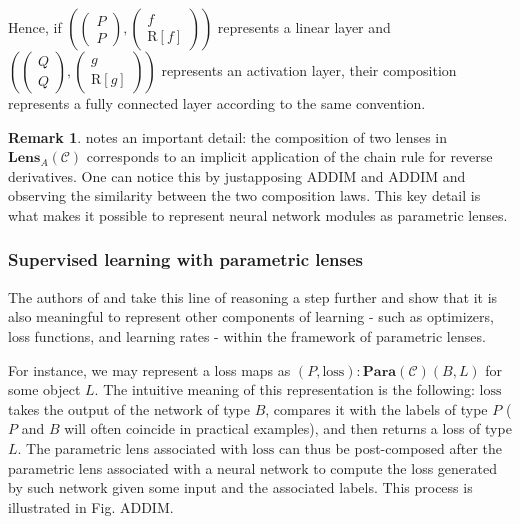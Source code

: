 \documentclass[12pt,a4paper,openright,twoside]{report}
\theoremstyle{plain}
\theoremstyle{definition}
\newtheorem{remark}[proposition]{Remark}
\begin{document}
Hence, if $\left(\left(\begin{smallmatrix} P \\ P \end{smallmatrix}\right),\left(\begin{smallmatrix} f \\ \mathrm{R}[f] \end{smallmatrix}\right)\right)$ represents a linear layer and $\left(\left(\begin{smallmatrix} Q \\ Q \end{smallmatrix}\right),\left(\begin{smallmatrix} g \\ \mathrm{R}[g] \end{smallmatrix}\right)\right)$ represents an activation layer, their composition represents a fully connected layer according to the same convention.


\begin{remark}
  \cite{shiebler2021category} notes an important detail: the composition of two lenses in $\mathbf{Lens}_A(\mathcal{C})$ corresponds to an implicit application of the chain rule for reverse derivatives. One can notice this by justapposing ADDIM and ADDIM and observing the similarity between the two composition laws. This key detail is what makes it possible to represent neural network modules as parametric lenses.
\end{remark}
 

\subsubsection{Supervised learning with parametric lenses}


The authors of \cite{cruttwell2022categorical} and \cite{gavranovic2024fundamental} take this line of reasoning a step further and show that it is also meaningful to represent other components of learning - such as optimizers, loss functions, and learning rates - within the framework of parametric lenses. 


For instance, we may represent a loss maps as $(P,\mathrm{loss}) : \mathbf{Para}(\mathcal{C})(B,L)$ for some object $L$. The intuitive meaning of this representation is the following: $\mathrm{loss}$ takes the output of the network of type $B$, compares it with the labels of type $P$ ($P$ and $B$ will often coincide in practical examples), and then returns a loss of type $L$. The parametric lens associated with $\mathrm{loss}$ can thus be post-composed after the parametric lens associated with a neural network to compute the loss generated by such network given some input and the associated labels. This process is illustrated in Fig. ADDIM.
\end{document}
